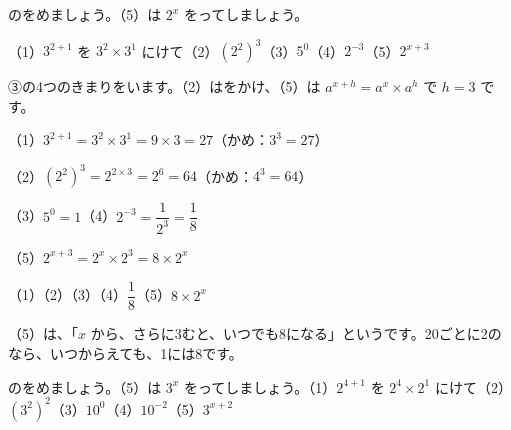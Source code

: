 \begin{reidai}[\R{指数}{し|すう}のきまりを\R{使}{つか}う]
のをめましょう。（5）は $2^x$ をってしましょう。\par
（1）\nobreak $3^{2+1}$ を $3^2\times3^1$ にけて\quad（2）\nobreak $(2^2)^3$\quad（3）\nobreak $5^0$\quad（4）\nobreak $2^{-3}$\quad（5）\nobreak $2^{x+3}$\par
\kangaekata ③の4つのきまりをいます。（2）はをかけ、（5）は $a^{x+h}=a^x\times a^h$ で $h=3$ です。\par
\shiki（1）\nobreak $3^{2+1}=3^2\times3^1=9\times3=27$\quad（かめ：$3^3=27$）\par
\hspace*{2.6\zw}（2）\nobreak $(2^2)^3=2^{2\times3}=2^6=64$\quad（かめ：$4^3=64$）\par
\hspace*{2.6\zw}（3）\nobreak $5^0=1$\quad（4）\nobreak $2^{-3}=\dfrac{1}{2^3}=\dfrac{1}{8}$\par
\hspace*{2.6\zw}（5）\nobreak $2^{x+3}=2^x\times2^3=8\times2^x$\par
\kotae（1）\quad（2）\quad（3）\quad（4）\nobreak $\dfrac{1}{8}$\quad（5）\nobreak $8\times2^x$
\end{reidai}
\noindent（5）は、「$x$ から、さらに3むと、いつでも8になる」というです。20ごとに2のなら、いつからえても、1には8です。

\begin{jibun}
のをめましょう。（5）は $3^x$ をってしましょう。（1）\nobreak $2^{4+1}$ を $2^4\times2^1$ にけて（2）\nobreak $(3^2)^2$（3）\nobreak $10^0$（4）\nobreak $10^{-2}$（5）\nobreak $3^{x+2}$
\end{jibun}

